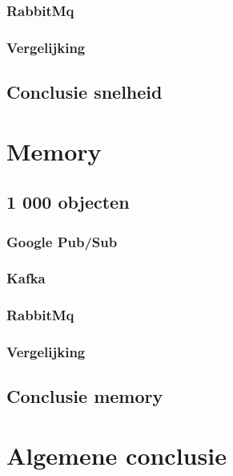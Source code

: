 \subsubsection{RabbitMq}
\subsubsection{Vergelijking}

\subsection{Conclusie snelheid}

\section{Memory}
\subsection{1 000 objecten}
\subsubsection{Google Pub/Sub}
\subsubsection{Kafka}
\subsubsection{RabbitMq}
\subsubsection{Vergelijking}

\subsection{Conclusie memory}

\section{Algemene conclusie}

